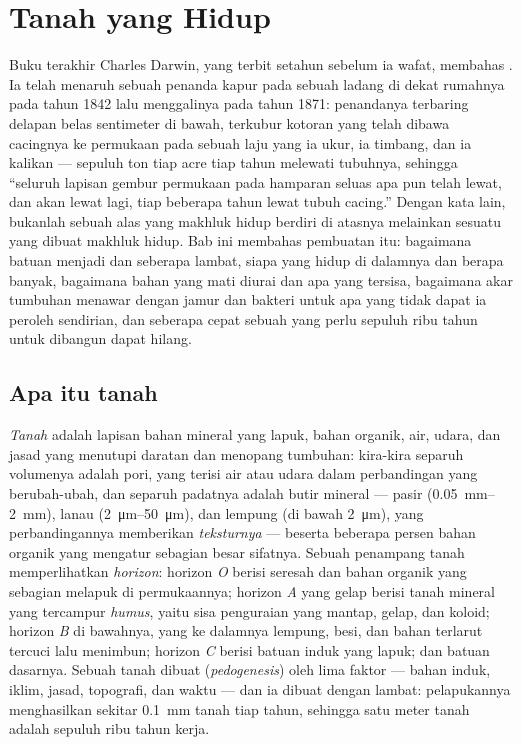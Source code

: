 \chapter{Tanah yang Hidup}\label{ch:b2:living-soil}

Buku terakhir Charles Darwin, yang terbit setahun sebelum ia wafat,
membahas . Ia telah menaruh sebuah penanda kapur pada
sebuah ladang di dekat rumahnya pada tahun 1842 lalu menggalinya pada
tahun 1871: penandanya terbaring delapan belas sentimeter di bawah,
terkubur kotoran yang telah dibawa cacingnya ke permukaan pada sebuah
laju yang ia ukur, ia timbang, dan ia kalikan --- sepuluh ton 
tiap acre tiap tahun melewati tubuhnya, sehingga ``seluruh lapisan
gembur permukaan pada hamparan seluas apa pun telah lewat, dan akan
lewat lagi, tiap beberapa tahun lewat tubuh cacing.'' Dengan kata lain,
 bukanlah sebuah alas yang makhluk hidup berdiri di atasnya
melainkan sesuatu yang dibuat makhluk hidup. Bab ini membahas
pembuatan itu: bagaimana batuan menjadi  dan seberapa lambat,
siapa yang hidup di dalamnya dan berapa banyak, bagaimana bahan yang
mati diurai dan apa yang tersisa, bagaimana akar tumbuhan menawar
dengan jamur dan bakteri untuk apa yang tidak dapat ia peroleh
sendirian, dan seberapa cepat sebuah  yang perlu sepuluh ribu
tahun untuk dibangun dapat hilang.

\section{Apa itu tanah}

\begin{definition}\label{def:b2:living-soil:soil}
\emph{Tanah} adalah lapisan bahan mineral yang lapuk, bahan organik,
air, udara, dan jasad yang menutupi daratan dan menopang tumbuhan:
kira-kira separuh volumenya adalah pori, yang terisi air atau udara
dalam perbandingan yang berubah-ubah, dan separuh padatnya adalah butir
mineral --- pasir (\qtyrange{0.05}{2}{mm}), lanau
(\qtyrange{2}{50}{\micro m}), dan lempung (di bawah
\qty{2}{\micro m}), yang perbandingannya memberikan \emph{teksturnya}
--- beserta beberapa persen bahan organik yang mengatur sebagian besar
sifatnya. Sebuah penampang tanah memperlihatkan \emph{horizon}:
horizon \emph{O} berisi seresah dan bahan organik yang sebagian melapuk
di permukaannya; horizon \emph{A} yang gelap berisi tanah mineral yang
tercampur \emph{humus}, yaitu sisa penguraian yang mantap, gelap, dan
koloid; horizon \emph{B} di bawahnya, yang ke dalamnya lempung, besi,
dan bahan terlarut tercuci lalu menimbun; horizon \emph{C} berisi
batuan induk yang lapuk; dan batuan dasarnya. Sebuah tanah dibuat
(\emph{pedogenesis}) oleh lima faktor --- bahan induk, iklim, jasad,
topografi, dan waktu --- dan ia dibuat dengan lambat: pelapukannya
menghasilkan sekitar \qty{0.1}{mm} tanah tiap tahun, sehingga satu
meter tanah adalah sepuluh ribu tahun kerja.
\end{definition}

